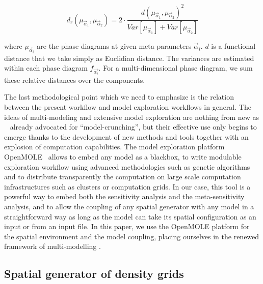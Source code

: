 \documentclass[3p,times,procedia]{elsarticle}
\begin{document}
\begin{equation}\label{eq:phase-distance}
d_r\left(\mu_{\vec{\alpha}_1},\mu_{\vec{\alpha}_2}\right) = 2 \cdot \frac{d(\mu_{\vec{\alpha}_1},\mu_{\vec{\alpha}_2})^2}{Var\left[\mu_{\vec{\alpha}_1}\right] + Var\left[\mu_{\vec{\alpha}_2}\right]}
\end{equation}

where $\mu_{\vec{\alpha}_i}$ are the phase diagrams at given meta-parameters $\vec{\alpha}_i$. $d$ is a functional distance that we take simply as Euclidian distance. The variances are estimated within each phase diagram $f_{\vec{\alpha_i}}$. For a multi-dimensional phase diagram, we sum these relative distances over the components. 

The last methodological point which we need to emphasize is the relation between the present workflow and model exploration workflows in general. The ideas of multi-modeling and extensive model exploration are nothing from new as ~\cite{openshaw1983data} already advocated for ``model-crunching'', but their effective use only begins to emerge thanks to the development of new methods and tools together with an explosion of computation capabilities. The model exploration platform OpenMOLE~\citep{reuillon2013openmole} allows to embed any model as a blackbox, to write modulable exploration workflow using advanced methodologies such as genetic algorithms and to distribute transparently the computation on large scale computation infrastructures such as clusters or computation grids. In our case, this tool is a powerful way to embed both the sensitivity analysis and the meta-sensitivity analysis, and to allow the coupling of any spatial generator with any model in a straightforward way as long as the model can take its spatial configuration as an input or from an input file. In this paper, we use the OpenMOLE platform for the spatial environment and the model coupling, placing ourselves in the renewed framework of multi-modelling \citep{cottineau2015modular}.
\subsection{Spatial generator of density grids}
\end{document}
